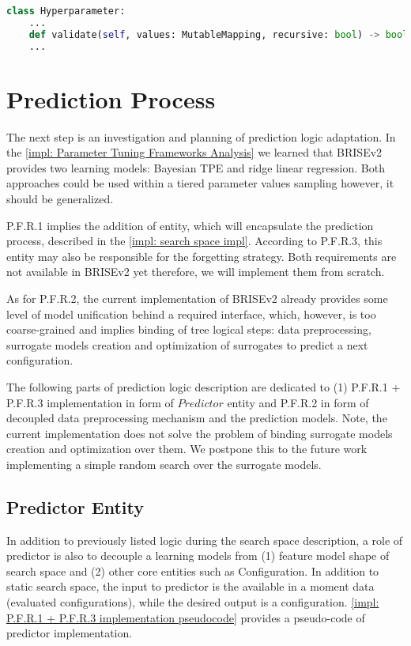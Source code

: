 \begin{lstlisting}[language=Python, caption=S.F.R.4 implementation., label=impl: S.F.R.4 listing]
class Hyperparameter:
	...
	def validate(self, values: MutableMapping, recursive: bool) -> bool: pass
	...
\end{lstlisting}


\section{Prediction Process}\label{impl: prediction logic}
The next step is an investigation and planning of prediction logic adaptation.
In the \cref{impl: Parameter Tuning Frameworks Analysis} we learned that BRISEv2 provides two learning models: Bayesian TPE and ridge linear regression. Both approaches could be used within a tiered parameter values sampling however, it should be generalized.

P.F.R.1 implies the addition of entity, which will encapsulate the prediction process, described in the \cref{impl: search space impl}. According to P.F.R.3, this entity may also be responsible for the forgetting strategy. Both requirements are not available in BRISEv2 yet therefore, we will implement them from scratch.

As for P.F.R.2, the current implementation of BRISEv2 already provides some level of model unification behind a required interface, which, however, is too coarse-grained and implies binding of tree logical steps: data preprocessing, surrogate models creation and optimization of surrogates to predict a next configuration.

The following parts of prediction logic description are dedicated to (1) P.F.R.1 + P.F.R.3 implementation in form of $Predictor$ entity and P.F.R.2 in form of decoupled data preprocessing mechanism and the prediction models. Note, the current implementation does not solve the problem of binding surrogate models creation and optimization over them. We postpone this to the future work implementing a simple random search over the surrogate models.

\subsection{Predictor Entity}
In addition to previously listed logic during the search space description, a role of predictor is also to decouple a learning models from (1) feature model shape of search space and (2) other core entities such as Configuration. In addition to static search space, the input to predictor is the available in a moment data (evaluated configurations), while the desired output is a configuration. \cref{impl: P.F.R.1 + P.F.R.3 implementation pseudocode} provides a pseudo-code of predictor implementation.

